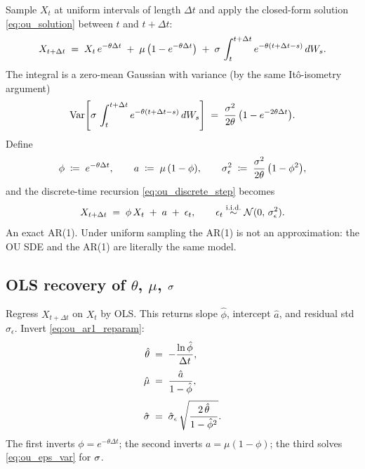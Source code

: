 Sample $X_t$ at uniform intervals of length $\Delta t$ and apply
the closed-form solution \eqref{eq:ou_solution} between $t$ and
$t + \Delta t$:
\begin{equation}
  X_{t+\Delta t}
  \;=\; X_t\,e^{-\theta \Delta t}
       \;+\; \mu\,\bigl(1 - e^{-\theta \Delta t}\bigr)
       \;+\; \sigma\,\int_t^{t+\Delta t} e^{-\theta(t+\Delta t - s)}\,dW_s.
  \label{eq:ou_discrete_step}
\end{equation}
The integral is a zero-mean Gaussian with variance (by the same
It\^o-isometry argument)
\begin{equation}
  \operatorname{Var}\!\left[\sigma\,\int_t^{t+\Delta t} e^{-\theta(t+\Delta t - s)}\,dW_s\right]
  \;=\; \frac{\sigma^2}{2\theta}\,\bigl(1 - e^{-2\theta\Delta t}\bigr).
  \label{eq:ou_eps_var}
\end{equation}
Define
\begin{equation}
  \phi \;\coloneqq\; e^{-\theta \Delta t}, \qquad
  a   \;\coloneqq\; \mu\,(1 - \phi), \qquad
  \sigma_\epsilon^2 \;\coloneqq\; \frac{\sigma^2}{2\theta}\,\bigl(1 - \phi^2\bigr),
  \label{eq:ou_ar1_reparam}
\end{equation}
and the discrete-time recursion \eqref{eq:ou_discrete_step}
becomes
\begin{equation}
  X_{t+\Delta t} \;=\; \phi\,X_t \;+\; a \;+\; \epsilon_t,
  \qquad \epsilon_t \overset{\text{i.i.d.}}{\sim}\mathcal{N}(0,\,\sigma_\epsilon^2).
  \label{eq:ou_ar1}
\end{equation}
An exact AR(1). Under uniform sampling the AR(1) is not an
approximation: the OU SDE and the AR(1) are literally the same
model.

\subsection{OLS recovery of \texorpdfstring{$\theta$, $\mu$, $\sigma$}{theta, mu, sigma}}
\label{subsec:ch9_ols}

Regress $X_{t+\Delta t}$ on $X_t$ by OLS. This returns slope
$\hat\phi$, intercept $\hat a$, and residual std
$\hat\sigma_\epsilon$. Invert \eqref{eq:ou_ar1_reparam}:
\begin{align}
  \hat\theta \;&=\; -\frac{\ln \hat\phi}{\Delta t},
                                            \label{eq:ou_theta_hat} \\[0.25em]
  \hat\mu    \;&=\; \frac{\hat a}{1 - \hat\phi},
                                            \label{eq:ou_mu_hat} \\[0.25em]
  \hat{\sigma} \;&=\; \hat\sigma_\epsilon\,
                  \sqrt{\frac{2\,\hat\theta}{1 - \hat\phi^2}}.
                                            \label{eq:ou_sigma_hat}
\end{align}
The first inverts $\phi = e^{-\theta \Delta t}$; the second
inverts $a = \mu(1-\phi)$; the third solves \eqref{eq:ou_eps_var}
for $\sigma$.

